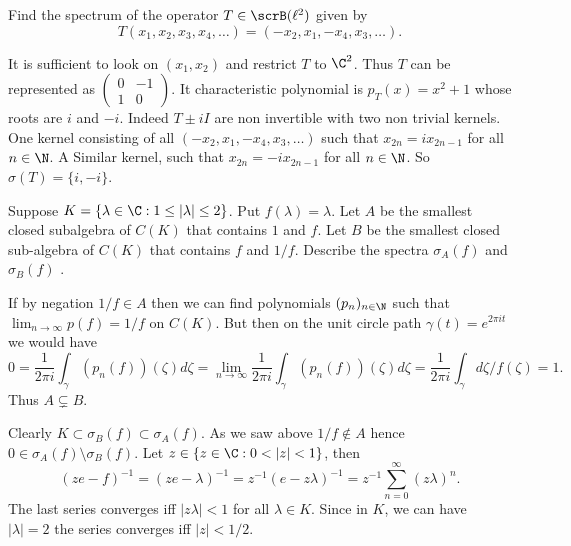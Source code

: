 \begin{enumerate}
\begin{excopy}
Find the spectrum of the operator \(T \in \scrB(\ell^2)\) given by
\begin{equation*}
T(x_1,x_2,x_3,x_4,\ldots) = (-x_2,x_1,-x_4,x_3,\ldots).
\end{equation*}
\end{excopy}
It is sufficient to look on \((x_1,x_2)\)
and restrict $T$ to \(\C^2\). Thus $T$ can be represented as
\(\left(
\begin{smallmatrix}
0 & -1 \\
1 & 0
\end{smallmatrix}
\right)\). It characteristic polynomial is \(p_T(x) = x^2 + 1\)
whose roots are \(i\) and \(-i\).
Indeed \(T \pm iI\) are non invertible with two non trivial kernels.
One kernel
consisting of all \((-x_2,x_1,-x_4,x_3,\ldots)\)
such that \(x_{2n} = ix_{2n-1}\) for all \(n\in\N\).
A Similar kernel, such that \(x_{2n} = -ix_{2n-1}\) for all \(n\in\N\).
So \(\sigma(T) = \{i, -i\}\).

\begin{excopy}
Suppose \(K = \{\lambda \in \C: 1 \leq |\lambda| \leq 2\}\).
  Put \(f(\lambda) = \lambda\). Let $A$ be the smallest closed
subalgebra of \(C(K)\) that contains $1$ and $f$.
Let $B$ be the smallest closed sub-algebra
  of \(C(K)\) that contains $f$ and \(1/f\).
  Describe the spectra \(\sigma_A(f)\) and \(\sigma_B(f)\) .
\end{excopy}

If by negation \(1/f \in A\) then we can find polynomials \((p_n)_{n\in\N}\)
such that \(\lim_{n\to\infty} p(f) = 1/f\) on \(C(K)\).
But then on the unit circle path \(\gamma(t) = e^{2\pi i t}\)
we would have
\begin{equation*}
0 = \frac{1}{2\pi i}\int_{\gamma} (p_n(f))(\zeta)d\zeta
  = \lim_{n\to\infty}\frac{1}{2\pi i}\int_{\gamma} (p_n(f))(\zeta)d\zeta
  = \frac{1}{2\pi i}\int_{\gamma} d\zeta/f(\zeta) = 1.
\end{equation*}
Thus \(A \subsetneq B\).

Clearly \(K \subset \sigma_B(f) \subset \sigma_A(f)\).
As we saw above \(1/f \notin A\)
hence \(0 \in \sigma_A(f) \setminus \sigma_B(f)\).
Let \(z \in \{z \in \C: 0 < |z| < 1\}\), then
\begin{equation*}
(ze - f)^{-1}
= (ze - \lambda)^{-1}
= z^{-1}(e - z\lambda)^{-1}
= z^{-1}\sum_{n=0}^\infty (z\lambda)^n.
\end{equation*}
The last series converges iff \(|z\lambda| < 1\) for all \(\lambda \in K\).
Since in $K$, we can have \(|\lambda|=2\)
the series converges iff \(|z|<1/2\).


\end{enumerate}
